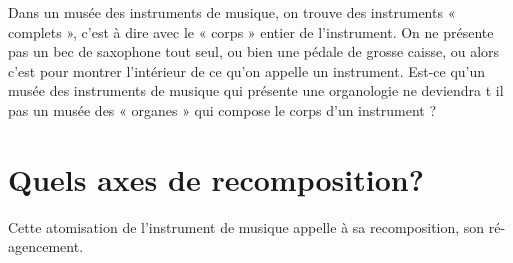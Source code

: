 Dans un musée des instruments de musique, on trouve des instruments « complets », c’est à dire avec le « corps » entier de l’instrument. On ne présente pas un bec de saxophone tout seul, ou bien une pédale de grosse caisse, ou alors c’est pour montrer l’intérieur de ce qu’on appelle un instrument. Est-ce qu’un musée des instruments de musique qui présente une organologie ne deviendra t il pas un musée des « organes » qui compose le corps d’un instrument ?



\section{Quels axes de recomposition?}
\label{sec:introduction:axes}

Cette atomisation de l'instrument de musique appelle à sa recomposition, son ré-agencement. 